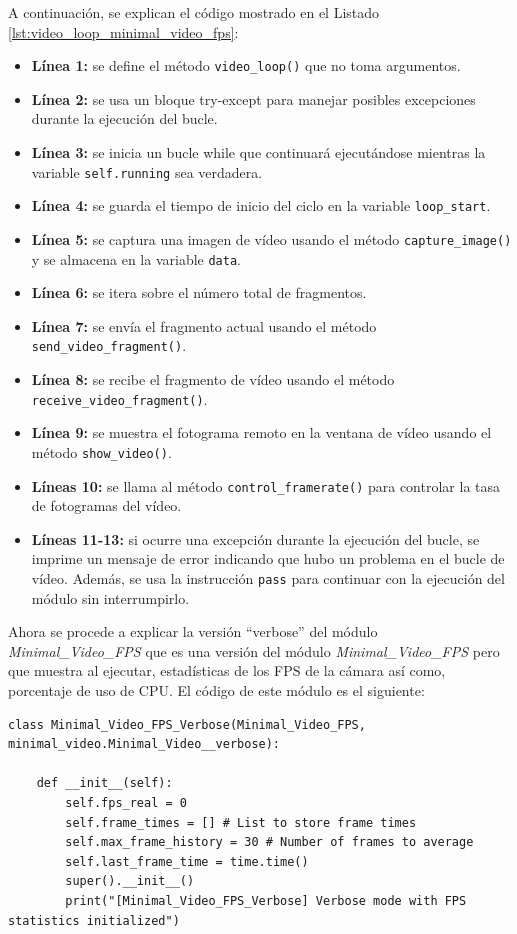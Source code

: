 A continuación, se explican el código mostrado en el Listado \ref{lst:video_loop_minimal_video_fps}:

\begin{itemize}
    \item \textbf{Línea 1:} se define el método \texttt{video\_loop()} que no toma argumentos.
    \item \textbf{Línea 2:} se usa un bloque try-except para manejar posibles excepciones durante la ejecución del bucle.
    \item \textbf{Línea 3:} se inicia un bucle while que continuará ejecutándose mientras la variable \texttt{self.running} sea verdadera.
    \item \textbf{Línea 4:} se guarda el tiempo de inicio del ciclo en la variable \texttt{loop\_start}.
    \item \textbf{Línea 5:} se captura una imagen de vídeo usando el método \texttt{capture\_image()} y se almacena en la variable \texttt{data}.
    \item \textbf{Línea 6:} se itera sobre el número total de fragmentos.
    \item \textbf{Línea 7:} se envía el fragmento actual usando el método \texttt{send\_video\_fragment()}.
    \item \textbf{Línea 8:} se recibe el fragmento de vídeo usando el método \texttt{receive\_video\_fragment()}.
    \item \textbf{Línea 9:} se muestra el fotograma remoto en la ventana de vídeo usando el método \texttt{show\_video()}.
    \item \textbf{Líneas 10:} se llama al método \texttt{control\_framerate()} para controlar la tasa de fotogramas del vídeo.
    \item \textbf{Líneas 11-13:} si ocurre una excepción durante la ejecución del bucle, se imprime un mensaje de error indicando que hubo un problema en el bucle de vídeo. Además, se usa la instrucción \texttt{pass} para continuar con la ejecución del módulo sin interrumpirlo.
\end{itemize}
\vspace{\baselineskip}

Ahora se procede a explicar la versión ``verbose'' del módulo \textit{Minimal\_Video\_FPS} que es una versión del módulo \textit{Minimal\_Video\_FPS} pero que muestra al ejecutar, estadísticas de los FPS de la cámara así como, porcentaje de uso de CPU. El código de este módulo es el siguiente:
\begin{lstlisting}[style=pythonstyle, caption={Comienzo del módulo Minimal\_Video\_FPS\_Verbose y su inicialización.}, label={lst:comienzo_minimal_video_fps_verbose}]
class Minimal_Video_FPS_Verbose(Minimal_Video_FPS, minimal_video.Minimal_Video__verbose):

    def __init__(self):
        self.fps_real = 0
        self.frame_times = [] # List to store frame times
        self.max_frame_history = 30 # Number of frames to average
        self.last_frame_time = time.time() 
        super().__init__()
        print("[Minimal_Video_FPS_Verbose] Verbose mode with FPS statistics initialized")
\end{lstlisting}
\vspace{\baselineskip}

